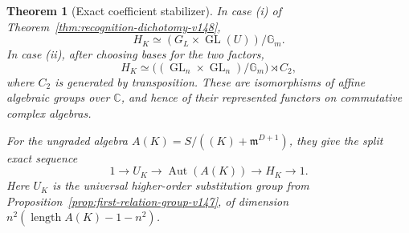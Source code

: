 \documentclass[11pt,reqno]{amsart}
\numberwithin{equation}{section}
\newtheorem{theorem}{Theorem}[section]
\theoremstyle{definition}\newtheorem{definition}[theorem]{Definition}
\theoremstyle{remark}\newtheorem{remark}[theorem]{Remark}
\newcommand{\C}{\mathbb C}\newcommand{\Q}{\mathbb Q}
\DeclareMathOperator{\length}{length}
\begin{document}
\begin{theorem}[Exact coefficient stabilizer]
\label{thm:exact-coefficient-stabilizer-v148}
In case (i) of Theorem~\ref{thm:recognition-dichotomy-v148},
\begin{equation}\label{eq:proper-stabilizer-v148}
                 H_K\simeq
        (G_L\times\operatorname{GL}(U))/\mathbb G_m.
\end{equation}
In case (ii), after choosing bases for the two factors,
\begin{equation}\label{eq:full-stabilizer-v148}
 H_K\simeq
 \bigl((\operatorname{GL}_n\times\operatorname{GL}_n)
                         /\mathbb G_m\bigr)\rtimes C_2,
\end{equation}
where \(C_2\) is generated by transposition.  These are
isomorphisms of affine algebraic groups over \(\C\), and hence
of their represented functors on commutative complex algebras.

For the ungraded algebra
\(A(K)=S/((K)+\mathfrak m^{D+1})\), they give the split exact
sequence
\begin{equation}\label{eq:complete-local-aut-v148}
 1\longrightarrow U_K\longrightarrow\operatorname{Aut}(A(K))
                      \longrightarrow H_K\longrightarrow1.
\end{equation}
Here \(U_K\) is the universal higher-order substitution group
from Proposition~\ref{prop:first-relation-group-v147}, of
dimension \(n^2(\length A(K)-1-n^2)\).
\end{theorem}
\end{document}
